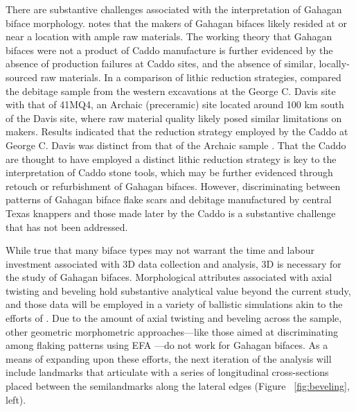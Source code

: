 \documentclass[review]{elsarticle}
\begin{document}
There are substantive challenges associated with the interpretation of Gahagan biface morphology. \citet{RN3684} notes that the makers of Gahagan bifaces likely resided at or near a location with ample raw materials. The working theory that Gahagan bifaces were not a product of Caddo manufacture is further evidenced by the absence of production failures at Caddo sites, and the absence of similar, locally-sourced raw materials. In a comparison of lithic reduction strategies, \citet{RN20701} compared the debitage sample from the western excavations at the George C. Davis site with that of 41MQ4, an Archaic (preceramic) site located around 100 km south of the Davis site, where raw material quality likely posed similar limitations on makers. Results indicated that the reduction strategy employed by the Caddo at George C. Davis was distinct from that of the Archaic sample \citep{RN20701}. That the Caddo are thought to have employed a distinct lithic reduction strategy is key to the interpretation of Caddo stone tools, which may be further evidenced through retouch or refurbishment of Gahagan bifaces. However, discriminating between patterns of Gahagan biface flake scars and debitage manufactured by central Texas knappers \citep{RN11568} and those made later by the Caddo is a substantive challenge that has not been addressed.

While true that many biface types may not warrant the time and labour investment associated with 3D data collection and analysis, 3D is necessary for the study of Gahagan bifaces. Morphological attributes associated with axial twisting and beveling hold substantive analytical value beyond the current study, and those data will be employed in a variety of ballistic simulations akin to the efforts of \citet{RN20857}. Due to the amount of axial twisting and beveling across the sample, other geometric morphometric approaches---like those aimed at discriminating among flaking patterns using EFA  \citep{RN253,RN4143,RN11975}---do not work for Gahagan bifaces. As a means of expanding upon these efforts, the next iteration of the analysis will include landmarks that articulate with a series of longitudinal cross-sections placed between the semilandmarks along the lateral edges (Figure ~\ref{fig:beveling}, left).
\end{document}
